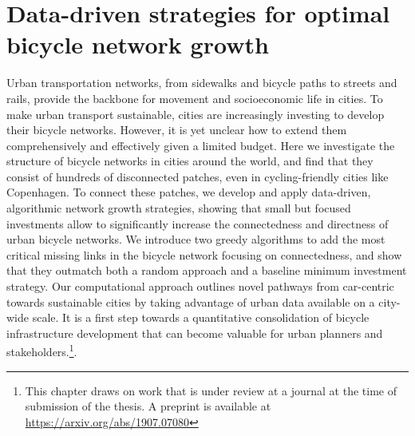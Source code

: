\chapter{Data-driven strategies for optimal bicycle network growth}


Urban transportation networks, from sidewalks and bicycle paths to streets and rails, provide the backbone for movement and socioeconomic life in cities. To make urban transport sustainable, cities are increasingly investing to develop their bicycle networks. However, it is yet unclear how to extend them comprehensively and effectively given a limited budget. Here we investigate the structure of bicycle networks in cities around the world, and find that they consist of hundreds of disconnected patches, even in cycling-friendly cities like Copenhagen. To connect these patches, we develop and apply data-driven, algorithmic network growth strategies, showing that small but focused investments allow to significantly increase the connectedness and directness of urban bicycle networks. We introduce two greedy algorithms to add the most critical missing links in the bicycle network focusing on connectedness, and show that they outmatch both a random approach and a baseline minimum investment strategy. Our computational approach outlines novel pathways from car-centric towards sustainable cities by taking advantage of urban data available on a city-wide scale. It is a first step towards a quantitative consolidation of bicycle infrastructure development that can become valuable for urban planners and stakeholders.\footnote{This chapter draws on work that is under review at a journal at the time of submission of the thesis. A preprint is available at \url{https://arxiv.org/abs/1907.07080}}.



